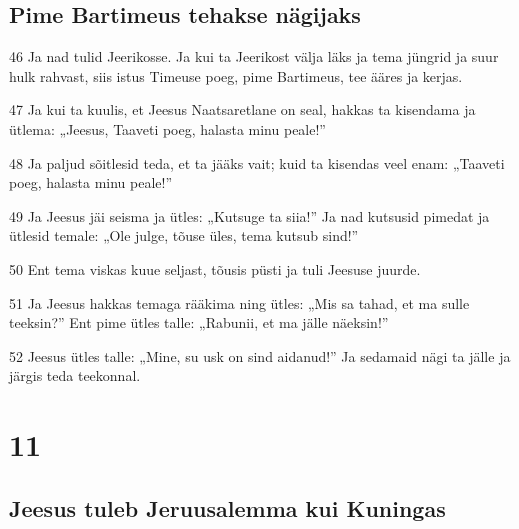\section*{Pime Bartimeus tehakse nägijaks}

\par 46 Ja nad tulid Jeerikosse. Ja kui ta Jeerikost välja läks ja tema jüngrid ja suur hulk rahvast, siis istus Timeuse poeg, pime Bartimeus, tee ääres ja kerjas.
\par 47 Ja kui ta kuulis, et Jeesus Naatsaretlane on seal, hakkas ta kisendama ja ütlema: „Jeesus, Taaveti poeg, halasta minu peale!”
\par 48 Ja paljud sõitlesid teda, et ta jääks vait; kuid ta kisendas veel enam: „Taaveti poeg, halasta minu peale!”
\par 49 Ja Jeesus jäi seisma ja ütles: „Kutsuge ta siia!” Ja nad kutsusid pimedat ja ütlesid temale: „Ole julge, tõuse üles, tema kutsub sind!”
\par 50 Ent tema viskas kuue seljast, tõusis püsti ja tuli Jeesuse juurde.
\par 51 Ja Jeesus hakkas temaga rääkima ning ütles: „Mis sa tahad, et ma sulle teeksin?” Ent pime ütles talle: „Rabunii, et ma jälle näeksin!”
\par 52 Jeesus ütles talle: „Mine, su usk on sind aidanud!” Ja sedamaid nägi ta jälle ja järgis teda teekonnal.


\chapter{11}

\section*{Jeesus tuleb Jeruusalemma kui Kuningas}

